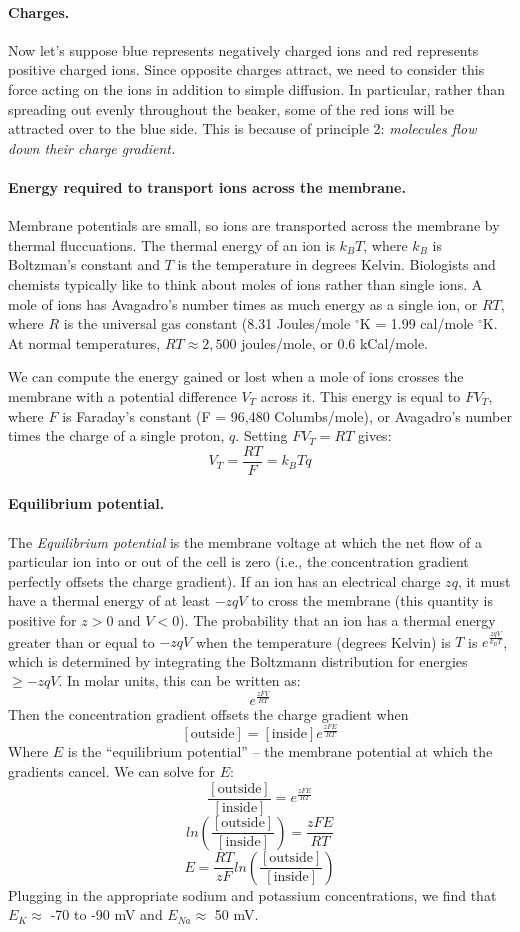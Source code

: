 \documentclass[11pt]{article}
\begin{document}
\paragraph{Charges.}  Now let's suppose blue represents negatively charged ions and red represents positive charged ions.  Since opposite charges attract, we need to consider this force acting on the ions in addition to simple diffusion.  In particular, rather than spreading out evenly throughout the beaker, some of the red ions will be attracted over to the blue side.  This is because of principle 2: \textit{molecules flow down their charge gradient.}

\paragraph{Energy required to transport ions across the membrane.} Membrane potentials are small, so ions are transported across the membrane by thermal fluccuations.  The thermal energy of an ion is $k_BT$, where $k_B$ is Boltzman's constant and $T$ is the temperature in degrees Kelvin.  Biologists and chemists typically like to think about moles of ions rather than single ions.  A mole of ions has Avagadro's number times as much energy as a single ion, or $RT$, where $R$ is the universal gas constant (8.31 Joules/mole $^\circ$K = 1.99 cal/mole $^\circ$K.  At normal temperatures, $RT \approx 2,500$ joules/mole, or 0.6 kCal/mole.

We can compute the energy gained or lost when a mole of ions crosses the membrane with a potential difference $V_T$ across it.  This energy is equal to $FV_T$, where $F$ is Faraday's constant (F = 96,480 Columbs/mole), or Avagadro's number times the charge of a single proton, $q$.  Setting $FV_T = RT$ gives:
\[
V_T = \frac{RT}{F} = {k_BT}{q}
\]

\paragraph{Equilibrium potential.}  The \textit{Equilibrium potential} is the membrane voltage at which the net flow of a particular ion into or out of the cell is zero (i.e., the concentration gradient perfectly offsets the charge gradient).  If an ion has an electrical charge $zq$, it must have a thermal energy of at least $-zqV$ to cross the membrane (this quantity is positive for $z > 0$ and $V < 0$). The probability that an ion has a thermal energy greater than or equal to $-zqV$ when the temperature (degrees Kelvin) is $T$ is $e^\frac{zqV}{k_BT}$, which is determined by integrating the Boltzmann distribution for energies $\geq -zqV$.  In molar units, this can be written as:
\[
e^\frac{zFV}{RT}
\]
Then the concentration gradient offsets the charge gradient when
\[
\mathrm{[outside]} = \mathrm{[inside]}e^\frac{zFE}{RT}
\]
Where $E$ is the ``equilibrium potential'' -- the membrane potential at which the gradients cancel.  We can solve for $E$:
\[
\frac{\mathrm{[outside]}}{\mathrm{[inside]}} = e^\frac{zFE}{RT}
\]
\[
ln(\frac{\mathrm{[outside]}}{\mathrm{[inside]}}) = \frac{zFE}{RT}
\]
\[
E = \frac{RT}{zF}ln(\frac{\mathrm{[outside]}}{\mathrm{[inside]}})
\]
Plugging in the appropriate sodium and potassium concentrations, we find that $E_{K} \approx$ -70 to -90 mV and $E_{Na} \approx$ 50 mV.
\end{document}
